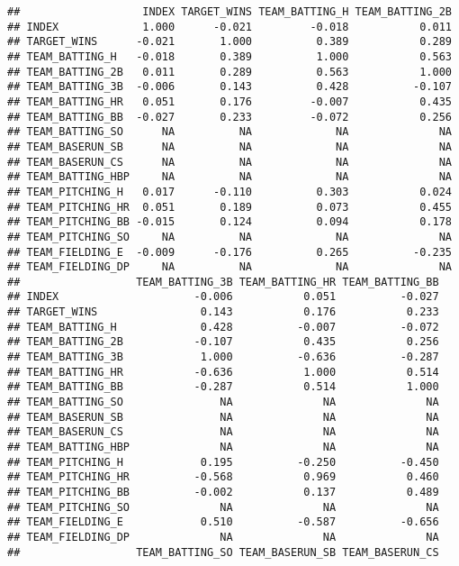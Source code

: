 \documentclass[]{article}
\begin{document}
\begin{verbatim}
##                   INDEX TARGET_WINS TEAM_BATTING_H TEAM_BATTING_2B
## INDEX             1.000      -0.021         -0.018           0.011
## TARGET_WINS      -0.021       1.000          0.389           0.289
## TEAM_BATTING_H   -0.018       0.389          1.000           0.563
## TEAM_BATTING_2B   0.011       0.289          0.563           1.000
## TEAM_BATTING_3B  -0.006       0.143          0.428          -0.107
## TEAM_BATTING_HR   0.051       0.176         -0.007           0.435
## TEAM_BATTING_BB  -0.027       0.233         -0.072           0.256
## TEAM_BATTING_SO      NA          NA             NA              NA
## TEAM_BASERUN_SB      NA          NA             NA              NA
## TEAM_BASERUN_CS      NA          NA             NA              NA
## TEAM_BATTING_HBP     NA          NA             NA              NA
## TEAM_PITCHING_H   0.017      -0.110          0.303           0.024
## TEAM_PITCHING_HR  0.051       0.189          0.073           0.455
## TEAM_PITCHING_BB -0.015       0.124          0.094           0.178
## TEAM_PITCHING_SO     NA          NA             NA              NA
## TEAM_FIELDING_E  -0.009      -0.176          0.265          -0.235
## TEAM_FIELDING_DP     NA          NA             NA              NA
##                  TEAM_BATTING_3B TEAM_BATTING_HR TEAM_BATTING_BB
## INDEX                     -0.006           0.051          -0.027
## TARGET_WINS                0.143           0.176           0.233
## TEAM_BATTING_H             0.428          -0.007          -0.072
## TEAM_BATTING_2B           -0.107           0.435           0.256
## TEAM_BATTING_3B            1.000          -0.636          -0.287
## TEAM_BATTING_HR           -0.636           1.000           0.514
## TEAM_BATTING_BB           -0.287           0.514           1.000
## TEAM_BATTING_SO               NA              NA              NA
## TEAM_BASERUN_SB               NA              NA              NA
## TEAM_BASERUN_CS               NA              NA              NA
## TEAM_BATTING_HBP              NA              NA              NA
## TEAM_PITCHING_H            0.195          -0.250          -0.450
## TEAM_PITCHING_HR          -0.568           0.969           0.460
## TEAM_PITCHING_BB          -0.002           0.137           0.489
## TEAM_PITCHING_SO              NA              NA              NA
## TEAM_FIELDING_E            0.510          -0.587          -0.656
## TEAM_FIELDING_DP              NA              NA              NA
##                  TEAM_BATTING_SO TEAM_BASERUN_SB TEAM_BASERUN_CS

\end{verbatim}
\end{document}
